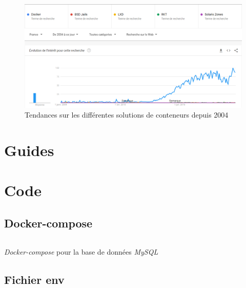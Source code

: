 \documentclass[
    iai, %
    il, %
]{heig-tb}
\begin{document}
\begin{center}
    \begin{figure}
        \includegraphics[width=\textwidth]{./assets/figures/google-trend-containers-2022.png}
        \caption[Tendances solutions de conteneurs]{Tendances sur les différentes solutions de conteneurs depuis 2004 \label{containers-trends}}
    \end{figure}
\end{center}

\chapter{Guides}







\chapter{Code}

\section{Docker-compose}

\begin{listing}[h]
    \inputminted{yaml}{assets/code/docker-compose-mysql.yml}
    \caption{\emph{Docker-compose} pour la base de données \emph{MySQL} \label{docker-compose-mysql}}
\end{listing}

\section{Fichier env}
\end{document}

